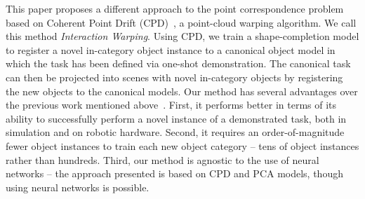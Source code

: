 \documentclass{article}
\newcommand{\evdp}[1]{\textcolor{blue}{[\textbf{EvdP:} #1]}}
\begin{document}


This paper proposes a different approach to the point correspondence problem based on Coherent Point Drift (CPD)~\cite{myronenko2010point},
a point-cloud warping algorithm.
We call this method \emph{Interaction Warping}. Using CPD, we train a shape-completion model to register a novel in-category object instance to a canonical object model in which the task has been defined via one-shot demonstration. The canonical task can then be projected into scenes with novel in-category objects by registering the new objects to the canonical models. Our method has several advantages over the previous work mentioned above~\cite{pan2022tax,wang2019dynamic,manuelli2019kpam}. First, it performs better in terms of its ability to successfully perform a novel instance of a demonstrated task, both in simulation and on robotic hardware. Second, it requires an order-of-magnitude fewer object instances to train each new object category -- tens of object instances rather than hundreds.
Third, our method is agnostic to the use of neural networks -- the approach presented is based on CPD and PCA models, though using neural networks is possible.%

\end{document}
